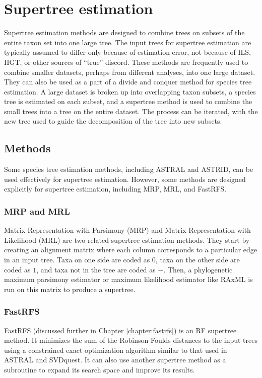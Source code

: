 \documentclass[edeposit,fullpage]{uiucthesis2014}
\theoremstyle{definition}
\begin{document}
\section{Supertree estimation}

Supertree estimation methods are designed to combine trees on subsets of the entire taxon set into one large tree. The input trees for supertree estimation are typically assumed to differ only because of estimation error, not because of ILS, HGT, or other sources of ``true'' discord. 
These methods are frequently used to combine smaller datasets, perhaps from different analyses, into one large dataset. They can also be used as a part of a divide and conquer method for species tree estimation. A large dataset is broken up into overlapping taxon subsets, a species tree is estimated on each subset, and a supertree method is used to combine the small trees into a tree on the entire dataset. The process can be iterated, with the new tree used to guide the decomposition of the tree into new subsets.

\subsection{Methods}

Some species tree estimation methods, including ASTRAL and ASTRID, can be used effectively for supertree estimation. However, some methods are designed explicitly for supertree estimation, including MRP, MRL, and FastRFS. 

\subsubsection{MRP and MRL}

Matrix Representation with Parsimony (MRP) and Matrix Representation with Likelihood (MRL) are two related supertree estimation methods. They start by creating an alignment matrix where each column corresponds to a particular edge in an input tree. Taxa on one side are coded as $0$, taxa on the other side are coded as $1$, and taxa not in the tree are coded as $-$. Then, a phylogenetic maximum parsimony estimator or maximum likelihood estimator like RAxML is run on this matrix to produce a supertree.

\subsubsection{FastRFS}

FastRFS (discussed further in Chapter \ref{chapter:fastrfs}) is an RF supertree method. It minimizes the sum of the Robinson-Foulds distances to the input trees using a constrained exact optimization algorithm similar to that used in ASTRAL and SVDquest. It can also use another supertree method as a subroutine to expand its search space and improve its results. 
\end{document}
